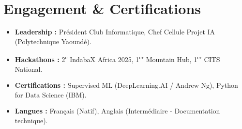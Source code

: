 \documentclass[a4paper,11pt]{article}
\begin{document}
\section{Engagement \& Certifications}
\begin{itemize}[leftmargin=*, nosep]
    \item \textbf{Leadership :} Président Club Informatique, Chef Cellule Projet IA (Polytechnique Yaoundé).
    \item \textbf{Hackathons :} 2\textsuperscript{e} IndabaX Africa 2025, 1\textsuperscript{er} Mountain Hub, 1\textsuperscript{er} CITS National.
    \item \textbf{Certifications :} Supervised ML (DeepLearning.AI / Andrew Ng), Python for Data Science (IBM).
    \item \textbf{Langues :} Français (Natif), Anglais (Intermédiaire - Documentation technique).
\end{itemize}
\end{document}
